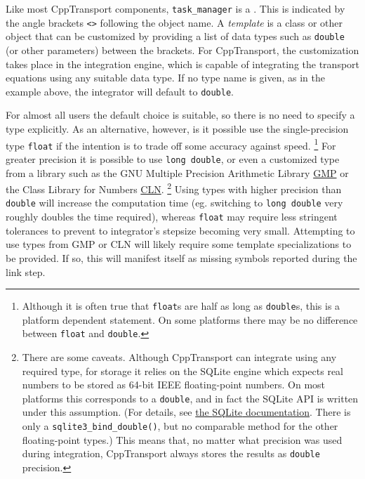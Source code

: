 \documentclass[11pt,a4paper]{article}
\newcounter{advancedbox}[section]
\newenvironment{advanced}[1]{\stepcounter{advancedbox}\begin{tcolorbox}[enhanced,breakable,colback=red!10,colbacktitle=red!20,colframe=red!40,coltitle=black,title={Advanced usage: {#1}},fonttitle=\sffamily\fontseries{b}\selectfont]}{\end{tcolorbox}}
\newcommand{\packagefont}{\sffamily}
\newcommand{\CppTransport}{{\packagefont CppTransport}}
\newcommand{\SQLite}{{\packagefont SQLite}}
\newcommand{\semibold}[1]{{\fontseries{b}\selectfont{#1}}}
\begin{document}
\begin{advanced}{Custom integration data types}
    \label{advanced:data-type}
    Like most {\CppTransport} components,
    \texttt{task_manager}
    is a \semibold{template class}. This is indicated by the
    angle brackets
    \texttt{<>} following the object name.
    A \emph{template} is a class or other object that can be customized
    by providing a list of data types 
    such as \texttt{double} (or other parameters)
    between the brackets.    
    For {\CppTransport}, the customization takes place in the integration engine,
    which is capable of integrating the transport equations using any
    suitable data type.
    If no type name is given, as in the example above,
    the integrator will default to
    \texttt{double}.
    
    For almost all users the default choice is suitable,
    so there is no need to specify a type explicitly.
    As an alternative, however, is it possible use the single-precision type
    \texttt{float}
    if the intention is to trade off some accuracy against speed.%
        \footnote{Although it is often true that
        \texttt{float}s are half as long as
        \texttt{double}s, this is a platform dependent statement.
        On some platforms there may be no difference between
        \texttt{float} and \texttt{double}.}
    For greater precision it is possible to use
    \texttt{long double},
    or even a customized type
    from a library such as the GNU Multiple Precision Arithmetic Library
    \href{https://gmplib.org}{GMP}
    or the Class Library for Numbers \href{http://www.ginac.de/CLN}{CLN}.%
        \footnote{There are some caveats. Although {\CppTransport} can integrate
        using any required type, for storage it relies on the
        {\SQLite} engine which expects real numbers to be stored as
        64-bit IEEE floating-point numbers.
        On most platforms this corresponds to a \texttt{double},
        and in fact the {\SQLite} API
        is written under this assumption.
        (For details, see
        \href{https://www.sqlite.org/c3ref/bind_blob.html}{the {\SQLite}
        documentation}.
        There is only a
        \texttt{sqlite3_bind_double()}, but no
        comparable method for the other floating-point types.)
        This means that, no matter what precision was used during integration,
        {\CppTransport} always stores the results
        as \texttt{double} precision.}
    Using types with higher precision than \texttt{double} will
    increase the computation time
    (eg. switching to \texttt{long double}
    very roughly doubles the time required),
    whereas
    \texttt{float} may require less stringent tolerances
    to prevent to integrator's stepsize becoming very small.
    Attempting to use types from GMP or CLN will likely require some
    template specializations to be provided. If so, this will manifest itself
    as missing symbols reported during the link step.
    

\end{advanced}
\end{document}
